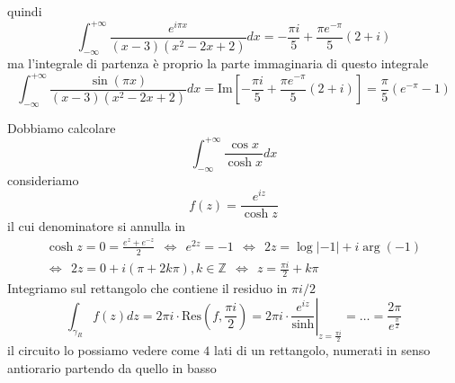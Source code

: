 quindi
\begin{equation*}
\int ^{+\infty }_{-\infty }\frac{e^{i\pi x}}{\left( x-3\right)\left( x^{2} -2x+2\right)} dx=-\frac{\pi i}{5} +\frac{\pi e^{-\pi }}{5}\left( 2+i\right)
\end{equation*}
ma l'integrale di partenza è proprio la parte immaginaria di questo integrale
\begin{equation*}
\int ^{+\infty }_{-\infty }\frac{\sin\left( \pi x\right)}{\left( x-3\right)\left( x^{2} -2x+2\right)} dx=\mathrm{Im}\left[ -\frac{\pi i}{5} +\frac{\pi e^{-\pi }}{5}\left( 2+i\right)\right] =\frac{\pi }{5}\left( e^{-\pi } -1\right)
\end{equation*}
\Soluzione

Dobbiamo calcolare
\begin{equation*}
\int ^{+\infty }_{-\infty }\frac{\cos x}{\cosh x} dx
\end{equation*}
consideriamo
\begin{equation*}
f\left( z\right) =\frac{e^{iz}}{\cosh z}
\end{equation*}
il cui denominatore si annulla in
\begin{gather*}
\cosh z=0=\frac{e^{z} +e^{-z}}{2} \ \ \iff \ \ e^{2z} =-1\ \ \iff \ \ 2z=\log\left| -1\right| +i\arg\left( -1\right)\\
\iff \ \ 2z=0+i\left( \pi +2k\pi \right) ,k\in \mathbb{Z} \ \ \iff \ \ z=\frac{\pi i}{2} +k\pi 
\end{gather*}
Integriamo sul rettangolo che contiene il residuo in $\pi i/2$
\begin{equation*}
\int _{\gamma _{R}} f\left( z\right) dz=2\pi i\cdotp \mathrm{Res}\left( f,\frac{\pi i}{2}\right) =2\pi i\cdotp \left. \frac{e^{iz}}{\sinh}\right| _{z=\frac{\pi i}{2}} =\dotsc =\frac{2\pi }{e^{\frac{\pi }{2}}}
\end{equation*}
il circuito lo possiamo vedere come $4$ lati di un rettangolo, numerati in senso antiorario partendo da quello in basso


